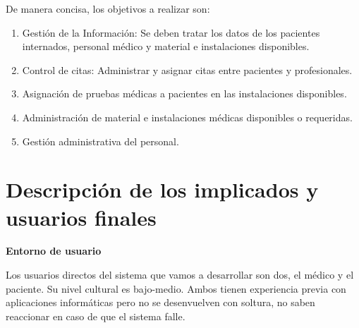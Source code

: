 \documentclass[12pt, spanish]{article}
\begin{document}
De manera concisa, los objetivos a realizar son:
\begin{enumerate}[start=1,label={\bfseries OBJ-\arabic*.}, leftmargin=2cm,listparindent=-\leftmargin]
  \item Gestión de la Información: Se deben tratar los datos de los pacientes internados, personal médico y material e instalaciones disponibles.
  \item Control de citas: Administrar y asignar citas entre pacientes y profesionales.
  
  \item Asignación de pruebas médicas a pacientes en las instalaciones disponibles.
  
  \item Administración de material e instalaciones médicas disponibles o requeridas.
  
  \item Gestión administrativa del personal.
  
\end{enumerate}


\section{Descripción de los implicados y usuarios finales}

\textbf{Entorno de usuario}

Los usuarios directos del sistema que vamos a desarrollar son dos, el médico y el paciente. Su nivel cultural es bajo-medio. Ambos tienen experiencia previa con aplicaciones informáticas pero no se desenvuelven con soltura, no saben reaccionar en caso de que el sistema falle. \\
\end{document}
